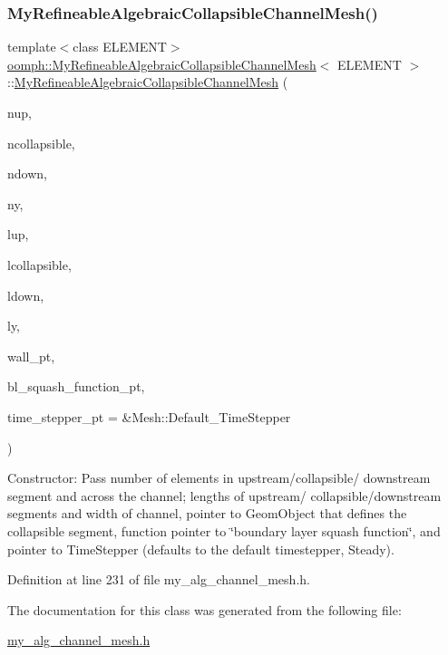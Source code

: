 \subsubsection{\texorpdfstring{My\+Refineable\+Algebraic\+Collapsible\+Channel\+Mesh()}{MyRefineableAlgebraicCollapsibleChannelMesh()}\hspace{0.1cm}{\footnotesize\ttfamily [2/2]}}
{\footnotesize\ttfamily template$<$class E\+L\+E\+M\+E\+NT$>$ \\
\hyperlink{classoomph_1_1MyRefineableAlgebraicCollapsibleChannelMesh}{oomph\+::\+My\+Refineable\+Algebraic\+Collapsible\+Channel\+Mesh}$<$ E\+L\+E\+M\+E\+NT $>$\+::\hyperlink{classoomph_1_1MyRefineableAlgebraicCollapsibleChannelMesh}{My\+Refineable\+Algebraic\+Collapsible\+Channel\+Mesh} (\begin{DoxyParamCaption}\item[{const unsigned \&}]{nup,  }\item[{const unsigned \&}]{ncollapsible,  }\item[{const unsigned \&}]{ndown,  }\item[{const unsigned \&}]{ny,  }\item[{const double \&}]{lup,  }\item[{const double \&}]{lcollapsible,  }\item[{const double \&}]{ldown,  }\item[{const double \&}]{ly,  }\item[{Geom\+Object $\ast$}]{wall\+\_\+pt,  }\item[{Collapsible\+Channel\+Domain\+::\+B\+L\+Squash\+Fct\+Pt}]{bl\+\_\+squash\+\_\+function\+\_\+pt,  }\item[{Time\+Stepper $\ast$}]{time\+\_\+stepper\+\_\+pt = {\ttfamily \&Mesh\+:\+:Default\+\_\+TimeStepper} }\end{DoxyParamCaption})\hspace{0.3cm}{\ttfamily [inline]}}



Constructor\+: Pass number of elements in upstream/collapsible/ downstream segment and across the channel; lengths of upstream/ collapsible/downstream segments and width of channel, pointer to Geom\+Object that defines the collapsible segment, function pointer to \char`\"{}boundary layer squash function\char`\"{}, and pointer to Time\+Stepper (defaults to the default timestepper, Steady). 



Definition at line 231 of file my\+\_\+alg\+\_\+channel\+\_\+mesh.\+h.



The documentation for this class was generated from the following file\+:\begin{DoxyCompactItemize}
\item 
\hyperlink{my__alg__channel__mesh_8h}{my\+\_\+alg\+\_\+channel\+\_\+mesh.\+h}\end{DoxyCompactItemize}

